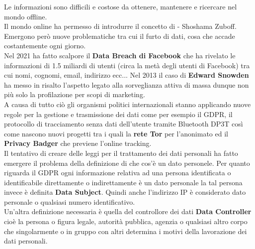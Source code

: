 Le informazioni sono difficili e costose da ottenere, mantenere e ricercare nel mondo offline.\\
Il mondo online ha permesso di introdurre il concetto di  - Shoshama Zuboff.\\
Emergono però nuove problematiche tra cui il furto di dati, cosa che accade costantemente ogni giorno.\\
Nel 2021 ha fatto scalpore il \textbf{Data Breach di Facebook} che ha rivelato le informazioni di 1.5 miliardi di utenti (circa la metà degli utenti di Facebook) tra cui nomi, cognomi, email, indirizzo ecc...
Nel 2013 il caso di \textbf{Edward Snowden} ha messo in risalto l'aspetto legato alla sorveglianza attiva di massa dunque non più solo la profilazione per scopi di marketing.\\
A causa di tutto ciò gli organismi politici internazionali stanno applicando nuove regole per la gestione e trasmissione dei dati come per esempio il \acrfull{GDPR}, il protocollo di tracciamento senza dati dell'utente tramite Bluetooth \acrfull{DP3T} così come nascono nuovi progetti tra i quali la \textbf{rete Tor} per l'anonimato ed il \textbf{Privacy Badger} che previene l'online tracking.\\
Il tentativo di creare delle leggi per il trattamento dei dati personali ha fatto emergere il problema della definizione di che cos'è un dato personele.
Per quanto riguarda il \acrshort{GDPR} ogni informazione relativa ad una persona identificata o identificabile direttamente o indirettamente è un dato personale la tal persona invece è definita \textbf{Data Subject}. Quindi anche l'indirizzo IP è considerato dato personale o qualsiasi numero identificativo.\\
Un'altra definizione necessaria è quella del controllore dei dati \textbf{Data Controller} cioè la persona o figura legale, autorità pubblica, agenzia o qualsiasi altro corpo che singolarmente o in gruppo con altri determina i motivi della lavorazione dei dati personali.

